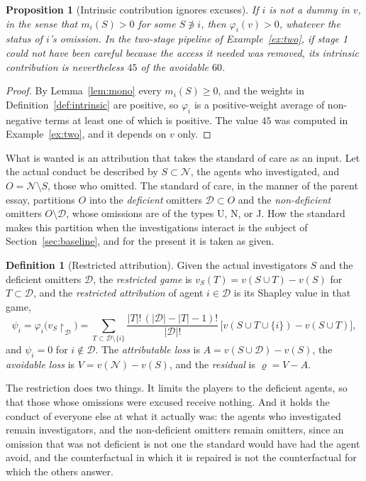 \documentclass[11pt]{article}
\newcommand{\N}{\mathcal N}
\newcommand{\Dfc}{\mathcal D}
\theoremstyle{plain}
\newtheorem{proposition}{Proposition}
\theoremstyle{definition}
\newtheorem{definition}{Definition}
\begin{document}
\begin{proposition}[Intrinsic contribution ignores excuses]\label{prop:excused}
If $i$ is not a dummy in $v$, in the sense that $m_i(S)>0$ for some $S\not\ni i$, then $\varphi_i(v)>0$, whatever the status of $i$'s omission. In the two-stage pipeline of Example~\ref{ex:two}, if stage 1 could not have been careful because the access it needed was removed, its intrinsic contribution is nevertheless $45$ of the avoidable $60$.
\end{proposition}

\begin{proof}
By Lemma~\ref{lem:mono} every $m_i(S)\ge0$, and the weights in Definition~\ref{def:intrinsic} are positive, so $\varphi_i$ is a positive-weight average of non-negative terms at least one of which is positive. The value $45$ was computed in Example~\ref{ex:two}, and it depends on $v$ only.
\end{proof}

What is wanted is an attribution that takes the standard of care as an input. Let the actual conduct be described by $S\subset\N$, the agents who investigated, and $O=\N\setminus S$, those who omitted. The standard of care, in the manner of the parent essay, partitions $O$ into the \emph{deficient} omitters $\Dfc\subset O$ and the \emph{non-deficient} omitters $O\setminus\Dfc$, whose omissions are of the types U, N, or J. How the standard makes this partition when the investigations interact is the subject of Section~\ref{sec:baseline}, and for the present it is taken as given.

\begin{definition}[Restricted attribution]\label{def:restricted}
Given the actual investigators $S$ and the deficient omitters $\Dfc$, the \emph{restricted game} is $v_S(T)=v(S\cup T)-v(S)$ for $T\subset\Dfc$, and the \emph{restricted attribution} of agent $i\in\Dfc$ is its Shapley value in that game,
\[
\psi_i=\varphi_i\bigl(v_S\!\restriction_{\Dfc}\bigr)=\sum_{T\subset\Dfc\setminus\{i\}}\frac{|T|!\,(|\Dfc|-|T|-1)!}{|\Dfc|!}\,\bigl[v(S\cup T\cup\{i\})-v(S\cup T)\bigr],
\]
and $\psi_i=0$ for $i\notin\Dfc$. The \emph{attributable loss} is $A=v(S\cup\Dfc)-v(S)$, the \emph{avoidable loss} is $V=v(\N)-v(S)$, and the \emph{residual} is $\varrho=V-A$.
\end{definition}

The restriction does two things. It limits the players to the deficient agents, so that those whose omissions were excused receive nothing. And it holds the conduct of everyone else at what it actually was: the agents who investigated remain investigators, and the non-deficient omitters remain omitters, since an omission that was not deficient is not one the standard would have had the agent avoid, and the counterfactual in which it is repaired is not the counterfactual for which the others answer.
\end{document}
